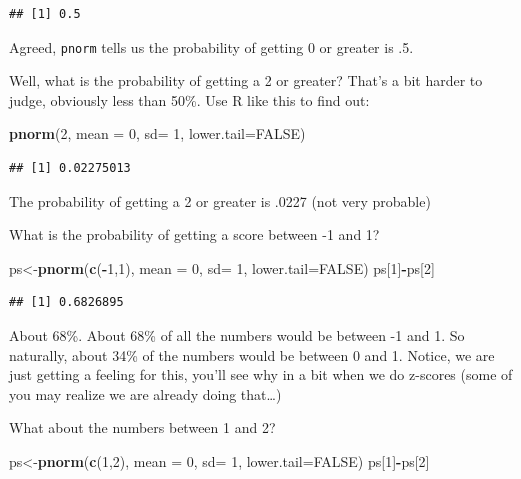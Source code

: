 \documentclass[]{book}
\newenvironment{Shaded}{\begin{snugshade}}{\end{snugshade}}
\newcommand{\KeywordTok}[1]{\textcolor[rgb]{0.13,0.29,0.53}{\textbf{#1}}}
\newcommand{\DataTypeTok}[1]{\textcolor[rgb]{0.13,0.29,0.53}{#1}}
\newcommand{\DecValTok}[1]{\textcolor[rgb]{0.00,0.00,0.81}{#1}}
\newcommand{\OtherTok}[1]{\textcolor[rgb]{0.56,0.35,0.01}{#1}}
\newcommand{\OperatorTok}[1]{\textcolor[rgb]{0.81,0.36,0.00}{\textbf{#1}}}
\newcommand{\NormalTok}[1]{#1}
\begin{document}
\begin{verbatim}
## [1] 0.5
\end{verbatim}

Agreed, \texttt{pnorm} tells us the probability of getting 0 or greater
is .5.

Well, what is the probability of getting a 2 or greater? That's a bit
harder to judge, obviously less than 50\%. Use R like this to find out:

\begin{Shaded}
\begin{Highlighting}[]
\KeywordTok{pnorm}\NormalTok{(}\DecValTok{2}\NormalTok{, }\DataTypeTok{mean =} \DecValTok{0}\NormalTok{, }\DataTypeTok{sd=} \DecValTok{1}\NormalTok{, }\DataTypeTok{lower.tail=}\OtherTok{FALSE}\NormalTok{)}
\end{Highlighting}
\end{Shaded}

\begin{verbatim}
## [1] 0.02275013
\end{verbatim}

The probability of getting a 2 or greater is .0227 (not very probable)

What is the probability of getting a score between -1 and 1?

\begin{Shaded}
\begin{Highlighting}[]
\NormalTok{ps<-}\KeywordTok{pnorm}\NormalTok{(}\KeywordTok{c}\NormalTok{(}\OperatorTok{-}\DecValTok{1}\NormalTok{,}\DecValTok{1}\NormalTok{), }\DataTypeTok{mean =} \DecValTok{0}\NormalTok{, }\DataTypeTok{sd=} \DecValTok{1}\NormalTok{, }\DataTypeTok{lower.tail=}\OtherTok{FALSE}\NormalTok{)}
\NormalTok{ps[}\DecValTok{1}\NormalTok{]}\OperatorTok{-}\NormalTok{ps[}\DecValTok{2}\NormalTok{]}
\end{Highlighting}
\end{Shaded}

\begin{verbatim}
## [1] 0.6826895
\end{verbatim}

About 68\%. About 68\% of all the numbers would be between -1 and 1. So
naturally, about 34\% of the numbers would be between 0 and 1. Notice,
we are just getting a feeling for this, you'll see why in a bit when we
do z-scores (some of you may realize we are already doing that\ldots{})

What about the numbers between 1 and 2?

\begin{Shaded}
\begin{Highlighting}[]
\NormalTok{ps<-}\KeywordTok{pnorm}\NormalTok{(}\KeywordTok{c}\NormalTok{(}\DecValTok{1}\NormalTok{,}\DecValTok{2}\NormalTok{), }\DataTypeTok{mean =} \DecValTok{0}\NormalTok{, }\DataTypeTok{sd=} \DecValTok{1}\NormalTok{, }\DataTypeTok{lower.tail=}\OtherTok{FALSE}\NormalTok{)}
\NormalTok{ps[}\DecValTok{1}\NormalTok{]}\OperatorTok{-}\NormalTok{ps[}\DecValTok{2}\NormalTok{]}
\end{Highlighting}
\end{Shaded}
\end{document}

